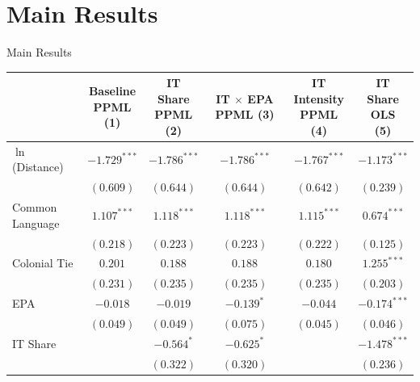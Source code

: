 \documentclass[aspectratio=169,11pt]{beamer}
\begin{document}
\section{Main Results}

\begin{frame}{Main Results}

    {\tiny
    \begin{tabular}{lccccc}
        \toprule
        & \makecell{Baseline\\PPML\\(1)} & \makecell{IT Share\\PPML\\(2)} &
          \makecell{IT $\times$ EPA\\PPML\\(3)} &
          \makecell{IT Intensity\\PPML\\(4)} & \makecell{IT Share\\OLS\\(5)} \\
        \midrule
        $\ln$(Distance)
          & $-1.729^{***}$ & $-1.786^{***}$ & $-1.786^{***}$ & $-1.767^{***}$ & $-1.173^{***}$ \\
          & $(0.609)$      & $(0.644)$      & $(0.644)$      & $(0.642)$      & $(0.239)$ \\[2pt]
        Common Language
          & $1.107^{***}$  & $1.118^{***}$  & $1.118^{***}$  & $1.115^{***}$  & $0.674^{***}$ \\
          & $(0.218)$      & $(0.223)$      & $(0.223)$      & $(0.222)$      & $(0.125)$ \\[2pt]
        Colonial Tie
          & $0.201$        & $0.188$        & $0.188$        & $0.180$        & $1.255^{***}$ \\
          & $(0.231)$      & $(0.235)$      & $(0.235)$      & $(0.235)$      & $(0.203)$ \\[2pt]
        EPA
          & $-0.018$       & $-0.019$       & $-0.139^{*}$   & $-0.044$       & $-0.174^{***}$ \\
          & $(0.049)$      & $(0.049)$      & $(0.075)$      & $(0.045)$      & $(0.046)$ \\[2pt]
        \rowcolor{ufblue!12}
        IT Share
          &                & $\mathbf{-0.564^{*}}$  & $\mathbf{-0.625^{*}}$  &  & $-1.478^{***}$ \\
        \rowcolor{ufblue!12}
          &                & $(0.322)$      & $(0.320)$      &                & $(0.236)$ \\[2pt]

\end{tabular}}
\end{frame}
\end{document}
